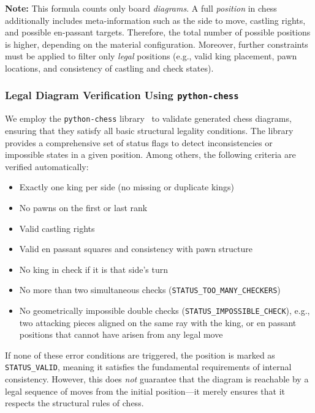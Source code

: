 \documentclass[12pt]{article}
\begin{document}
\noindent
\textbf{Note:}  
This formula counts only board \emph{diagrams}.  
A full \emph{position} in chess additionally includes meta-information such as the side to move, castling rights, and possible en-passant targets.  
Therefore, the total number of possible positions is higher, depending on the material configuration.  
Moreover, further constraints must be applied to filter only \emph{legal} positions (e.g., valid king placement, pawn locations, and consistency of castling and check states).

\subsubsection{Legal Diagram Verification Using \texttt{python-chess}}

We employ the \texttt{python-chess} library~\cite{python-chess} to validate generated chess diagrams, ensuring that they satisfy all basic structural legality conditions. 
The library provides a comprehensive set of status flags to detect inconsistencies or impossible states in a given position. 
Among others, the following criteria are verified automatically:

\begin{itemize}
    \item Exactly one king per side (no missing or duplicate kings)
    \item No pawns on the first or last rank
    \item Valid castling rights
    \item Valid en passant squares and consistency with pawn structure
    \item No king in check if it is that side’s turn
    \item No more than two simultaneous checks (\texttt{STATUS\_TOO\_MANY\_CHECKERS})
    \item No geometrically impossible double checks (\texttt{STATUS\_IMPOSSIBLE\_CHECK}), 
          e.g., two attacking pieces aligned on the same ray with the king,
          or en passant positions that cannot have arisen from any legal move
\end{itemize}

\noindent
If none of these error conditions are triggered, the position is marked as 
\texttt{STATUS\_VALID}, meaning it satisfies the fundamental requirements of internal consistency.
However, this does \emph{not} guarantee that the diagram is reachable by a legal sequence of moves from the initial position---it merely ensures that it respects the structural rules of chess.
\end{document}
